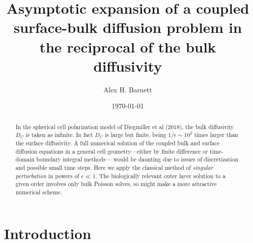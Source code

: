 \documentclass[10pt]{article}
\newcommand{\eps}{\epsilon}
\begin{document}
\title{Asymptotic expansion of a coupled surface-bulk diffusion problem in
  the reciprocal of the bulk diffusivity}

\author{Alex H. Barnett}
\date{\today}
\maketitle

\begin{abstract}
  In the spherical cell polarization model of Diegmiller et al (2018),
  the bulk diffusivity $D_C$ is taken as infinite.
  In fact $D_C$ is large but finite, being $1/\eps \sim 10^2$ times
  larger than the surface diffusivity.
  A full numerical solution of the coupled bulk and surface diffusion equations
  in a general cell geometry---either by finite difference or time-domain
  boundary integral methods---%
  would be daunting due to issues of discretization and possible small time steps.
  Here we apply the classical method of {\em singular perturbation} in powers of $\eps \ll 1$.
  The biologically relevant outer layer solution to a given order
  involves only bulk Poisson solves, so might make a more attractive numerical scheme.
\end{abstract}

\section{Introduction}
\end{document}
